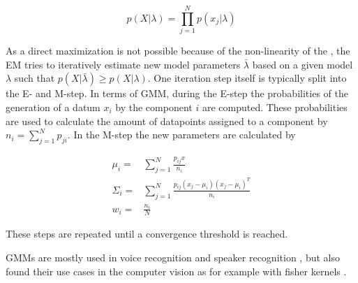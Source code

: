 \begin{equation}
\label{eqn:likelihood}
p(X|\lambda) = \prod_{j=1}^{N} p(x_j|\lambda)
\end{equation}

As a direct maximization is not possible because of the non-linearity of the , the \ac{EM} tries to iteratively estimate new model parameters $\bar{\lambda}$ based on a given model $\lambda$ such that $p(X|\bar{\lambda}) \ge p(X|\lambda)$. One iteration step itself is typically split into the E- and M-step. In terms of \ac{GMM}, during the E-step the probabilities of the generation of a datum $x_i$ by the component $i$ are computed. These probabilities are used to calculate the amount of datapoints assigned to a component by $n_i = \sum_{j=1}^N p_{ji}$. In the M-step the new parameters are calculated by

\begin{eqnarray}
\mu_i = &\sum_{j=1}^N \frac{p_{ij} x}{n_i} \\
\Sigma_i = & \sum_{j=1}^N \frac{p_{ij} (x_j - \mu_i) (x_j - \mu_i)^T}{n_i}\\
w_i  = & \frac{n_i}{N}
\end{eqnarray}

These steps are repeated until a convergence threshold is reached.

\acp{GMM} are mostly used in voice recognition and speaker recognition \cite{Reynolds1995}, but also found their use cases in the computer vision as for example with fisher kernels \cite{Perronnin2006}.
